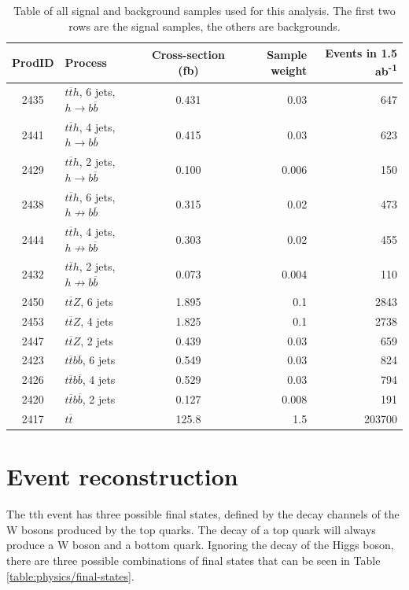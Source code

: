 \begin{table}[htp]
\centering
	\begin{tabular}{ c l c r r }
	\hline \hline
	\textbf{ProdID} & \textbf{Process} & \textbf{Cross-section (fb)} & \textbf{Sample weight} & \textbf{Events in 1.5 ab\textsuperscript{-1}} \\ \hline
	2435 & $t\overline{t}h$, 6 jets, $h \rightarrow b\overline{b}$ & 0.431 & 0.03 & 647 \\
	2441 & $t\overline{t}h$, 4 jets, $h \rightarrow b\overline{b}$ & 0.415 & 0.03 & 623 \\ \hline
	2429 & $t\overline{t}h$, 2 jets, $h \rightarrow b\overline{b}$ & 0.100 & 0.006 & 150 \\

	2438 & $t\overline{t}h$, 6 jets, $h \not\rightarrow b\overline{b}$ & 0.315 & 0.02 & 473	 \\
	2444 & $t\overline{t}h$, 4 jets, $h \not\rightarrow b\overline{b}$ & 0.303 & 0.02 & 455 \\
	2432 & $t\overline{t}h$, 2 jets, $h \not\rightarrow b\overline{b}$ & 0.073 & 0.004 & 110 \\

	2450 & $t\overline{t}Z$, 6 jets & 1.895 & 0.1 & 2843 \\
	2453 & $t\overline{t}Z$, 4 jets & 1.825 & 0.1 & 2738 \\
	2447 & $t\overline{t}Z$, 2 jets & 0.439 & 0.03 & 659 \\
	
	2423 & $t\overline{t}b\overline{b}$, 6 jets & 0.549 & 0.03 & 824 \\
	2426 & $t\overline{t}b\overline{b}$, 4 jets & 0.529 & 0.03 & 794 \\
	2420 & $t\overline{t}b\overline{b}$, 2 jets & 0.127 & 0.008 & 191 \\

	2417 & $t\overline{t}$ & 125.8 & 1.5 & 203700 \\ \hline \hline

	\end{tabular}
	\caption{Table of all signal and background samples used for this analysis. The first two rows are the signal samples, the others are backgrounds.}
	\label{table:physics/SM/generatedsamples}
\end{table}

\section{Event reconstruction}
The tth event has three possible final states, defined by the decay channels of the W bosons produced by the top quarks. The decay of a top quark will always produce a W boson and a bottom quark. Ignoring the decay of the Higgs boson, there are three possible combinations of final states that can be seen in Table \ref{table:physics/final-states}. \\

